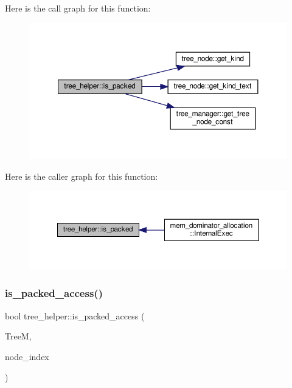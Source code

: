 Here is the call graph for this function\+:
\nopagebreak
\begin{figure}[H]
\begin{center}
\leavevmode
\includegraphics[width=350pt]{d7/d99/classtree__helper_abc76c244562398090b0f0341d0f92dae_cgraph}
\end{center}
\end{figure}
Here is the caller graph for this function\+:
\nopagebreak
\begin{figure}[H]
\begin{center}
\leavevmode
\includegraphics[width=350pt]{d7/d99/classtree__helper_abc76c244562398090b0f0341d0f92dae_icgraph}
\end{center}
\end{figure}
\mbox{\label{classtree__helper_ae706d20dd7fa5cc5d33649877084622b}} 
\subsubsection{\texorpdfstring{is\+\_\+packed\+\_\+access()}{is\_packed\_access()}}
{\footnotesize\ttfamily bool tree\+\_\+helper\+::is\+\_\+packed\+\_\+access (\begin{DoxyParamCaption}\item[{const \hyperlink{tree__manager_8hpp_a792e3f1f892d7d997a8d8a4a12e39346}{tree\+\_\+manager\+Const\+Ref} \&}]{TreeM,  }\item[{unsigned int}]{node\+\_\+index }\end{DoxyParamCaption})\hspace{0.3cm}{\ttfamily [static]}}



